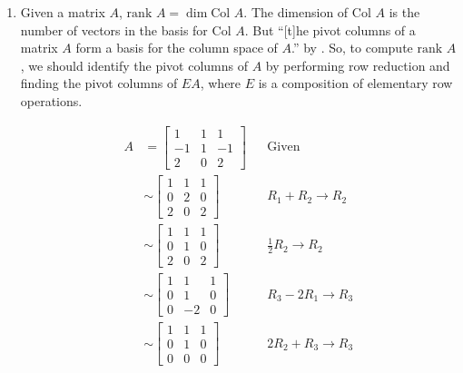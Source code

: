 \documentclass[10pt,letterpaper,final]{report}
\newcommand{\reason}[1]{&& \text{#1}}
\begin{document}
\begin{enumerate}[label=(\alph*)]
  \item Given a matrix $A$, $\text{rank } A = \dim \text{Col } A$. The dimension of $\text{Col } A$ is the number of vectors in the basis for $\text{Col } A$. But ``[t]he pivot columns of a matrix $A$ form a basis for the column space of $A$.'' by \cite[Theorem 2.13, p. 159]{LayEtAl2020LinearAlgebraAndItsApplications}. So, to compute $\text{rank } A$, we should identify the pivot columns of $A$ by performing row reduction and finding the pivot columns of $EA$, where $E$ is a composition of elementary row operations.

        \begin{align*}
          A & = \begin{bmatrix}
                  1  & 1 & 1  \\
                  -1 & 1 & -1 \\
                  2  & 0 & 2
                \end{bmatrix} \reason{Given}                        \\[1ex]
            & \sim \begin{bmatrix}
                     1 & 1 & 1 \\
                     0 & 2 & 0 \\
                     2 & 0 & 2
                   \end{bmatrix} \reason{$R_1 + R_2 \to R_2$}       \\[1ex]
            & \sim \begin{bmatrix}
                     1 & 1 & 1 \\
                     0 & 1 & 0 \\
                     2 & 0 & 2
                   \end{bmatrix} \reason{$\frac{1}{2} R_2 \to R_2$} \\[1ex]
            & \sim \begin{bmatrix}
                     1 & 1  & 1 \\
                     0 & 1  & 0 \\
                     0 & -2 & 0
                   \end{bmatrix} \reason{$R_3 - 2R_1 \to R_3$}      \\[1ex]
            & \sim \begin{bmatrix}
                     \boxed{1} & 1         & 1 \\
                     0         & \boxed{1} & 0 \\
                     0         & 0         & 0
                   \end{bmatrix} \reason{$2R_2 + R_3 \to R_3$}      \\[1ex]
        \end{align*}


\end{enumerate}
\end{document}
